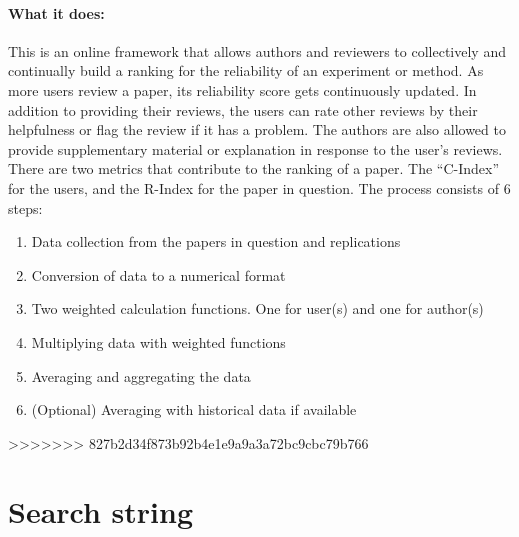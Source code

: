 \documentclass[
10pt, %
a4paper, %
oneside, %
headinclude,footinclude, %
BCOR5mm, %
]{scrartcl}
\begin{document}
\paragraph{What it does:} 
This is an online framework that allows authors and reviewers to collectively and continually build a ranking for the reliability of an experiment or method. As more users review a paper, its reliability score gets continuously updated. In addition to providing their reviews, the users can rate other reviews by their helpfulness or flag the review if it has a problem. The authors are also allowed to provide supplementary material or explanation in response to the user’s reviews. There are two metrics that contribute to the ranking of a paper. The “C-Index” for the users, and the R-Index for the paper in question. 
The process consists of 6 steps:
\begin{enumerate}
    \item
	Data collection from the papers in question and replications
    \item 
	Conversion of data to a numerical format
    \item 
	Two weighted calculation functions. One for user(s) and one for author(s)
    \item 
	Multiplying data with weighted functions
    \item 
	Averaging and aggregating the data
    \item 
	(Optional) Averaging with historical data if available
\end{enumerate}

>>>>>>> 827b2d34f873b92b4e1e9a9a3a72bc9cbc79b766
\section{Search string}
\end{document}
